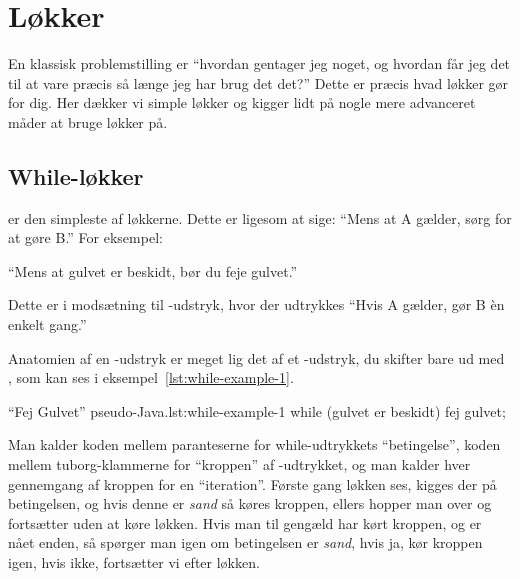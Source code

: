 \section{Løkker}

    En klassisk problemstilling er ``hvordan gentager jeg noget, og
    hvordan får jeg det til at vare præcis så længe jeg har brug det
    det?'' Dette er præcis hvad løkker gør for dig. Her dækker vi
    simple løkker og kigger lidt på nogle mere advanceret måder at
    bruge løkker på.


	\subsection{While-løkker}

		 er den simpleste af løkkerne. Dette er ligesom at
		sige: ``Mens at A gælder, sørg for at gøre B.'' For eksempel:

		``Mens at gulvet er beskidt, bør du feje gulvet.''

		Dette er i modsætning til -udstryk, hvor der udtrykkes
		``Hvis A gælder, gør B èn enkelt gang.''



		Anatomien af en -udstryk er meget lig det af et
		-udstryk, du skifter bare  ud med
		, som kan ses i eksempel~\ref{lst:while-example-1}.

		\begin{JavaCode}{``Fej Gulvet'' pseudo-Java.}{lst:while-example-1}
			while (gulvet er beskidt) {
				fej gulvet;
			}
		\end{JavaCode}

        Man kalder koden mellem paranteserne for while-udtrykkets
        ``betingelse'', koden mellem tuborg-klammerne for ``kroppen''
        af -udtrykket, og man kalder hver gennemgang
        af kroppen for en ``iteration''. Første gang løkken ses,
        kigges der på betingelsen, og hvis denne er \emph{sand} så
        køres kroppen, ellers hopper man over og fortsætter uden at
        køre løkken. Hvis man til gengæld har kørt kroppen, og er nået
        enden, så spørger man igen om betingelsen er \emph{sand}, hvis
        ja, kør kroppen igen, hvis ikke, fortsætter vi efter løkken.

